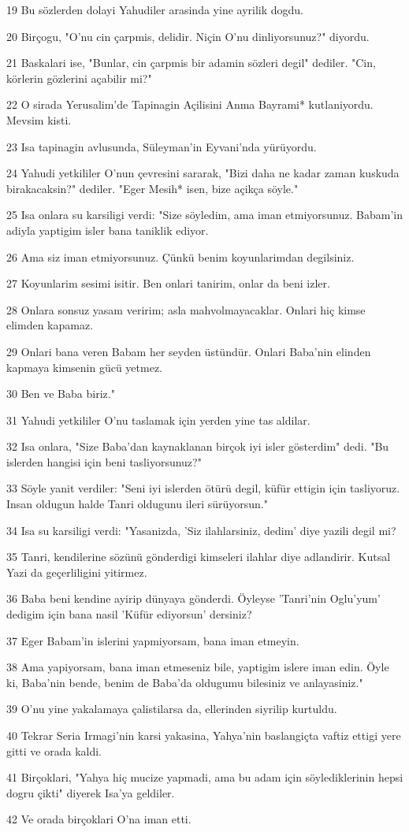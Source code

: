 \par 19 Bu sözlerden dolayi Yahudiler arasinda yine ayrilik dogdu.
\par 20 Birçogu, "O'nu cin çarpmis, delidir. Niçin O'nu dinliyorsunuz?" diyordu.
\par 21 Baskalari ise, "Bunlar, cin çarpmis bir adamin sözleri degil" dediler. "Cin, körlerin gözlerini açabilir mi?"
\par 22 O sirada Yerusalim'de Tapinagin Açilisini Anma Bayrami* kutlaniyordu. Mevsim kisti.
\par 23 Isa tapinagin avlusunda, Süleyman'in Eyvani'nda yürüyordu.
\par 24 Yahudi yetkililer O'nun çevresini sararak, "Bizi daha ne kadar zaman kuskuda birakacaksin?" dediler. "Eger Mesih* isen, bize açikça söyle."
\par 25 Isa onlara su karsiligi verdi: "Size söyledim, ama iman etmiyorsunuz. Babam'in adiyla yaptigim isler bana taniklik ediyor.
\par 26 Ama siz iman etmiyorsunuz. Çünkü benim koyunlarimdan degilsiniz.
\par 27 Koyunlarim sesimi isitir. Ben onlari tanirim, onlar da beni izler.
\par 28 Onlara sonsuz yasam veririm; asla mahvolmayacaklar. Onlari hiç kimse elimden kapamaz.
\par 29 Onlari bana veren Babam her seyden üstündür. Onlari Baba'nin elinden kapmaya kimsenin gücü yetmez.
\par 30 Ben ve Baba biriz."
\par 31 Yahudi yetkililer O'nu taslamak için yerden yine tas aldilar.
\par 32 Isa onlara, "Size Baba'dan kaynaklanan birçok iyi isler gösterdim" dedi. "Bu islerden hangisi için beni tasliyorsunuz?"
\par 33 Söyle yanit verdiler: "Seni iyi islerden ötürü degil, küfür ettigin için tasliyoruz. Insan oldugun halde Tanri oldugunu ileri sürüyorsun."
\par 34 Isa su karsiligi verdi: "Yasanizda, 'Siz ilahlarsiniz, dedim' diye yazili degil mi?
\par 35 Tanri, kendilerine sözünü gönderdigi kimseleri ilahlar diye adlandirir. Kutsal Yazi da geçerliligini yitirmez.
\par 36 Baba beni kendine ayirip dünyaya gönderdi. Öyleyse 'Tanri'nin Oglu'yum' dedigim için bana nasil 'Küfür ediyorsun' dersiniz?
\par 37 Eger Babam'in islerini yapmiyorsam, bana iman etmeyin.
\par 38 Ama yapiyorsam, bana iman etmeseniz bile, yaptigim islere iman edin. Öyle ki, Baba'nin bende, benim de Baba'da oldugumu bilesiniz ve anlayasiniz."
\par 39 O'nu yine yakalamaya çalistilarsa da, ellerinden siyrilip kurtuldu.
\par 40 Tekrar Seria Irmagi'nin karsi yakasina, Yahya'nin baslangiçta vaftiz ettigi yere gitti ve orada kaldi.
\par 41 Birçoklari, "Yahya hiç mucize yapmadi, ama bu adam için söylediklerinin hepsi dogru çikti" diyerek Isa'ya geldiler.
\par 42 Ve orada birçoklari O'na iman etti.


